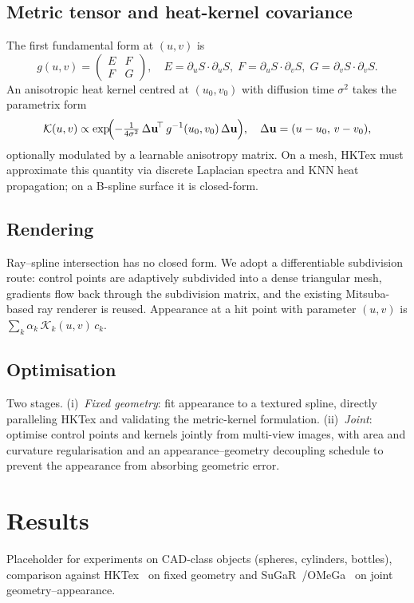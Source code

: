 \documentclass[acmtog, review=true, authorversion=false]{acmart}
\newcommand{\vect}[1]{\mathbf{#1}}
\begin{document}
\subsection{Metric tensor and heat-kernel covariance}
The first fundamental form at $(u,v)$ is
\[
  g(u,v)=\begin{pmatrix}E&F\\F&G\end{pmatrix},\quad
  E=\partial_uS\!\cdot\!\partial_uS,\;
  F=\partial_uS\!\cdot\!\partial_vS,\;
  G=\partial_vS\!\cdot\!\partial_vS.
\]
An anisotropic heat kernel centred at $(u_0,v_0)$ with diffusion time
$\sigma^2$ takes the parametrix form
\[
  \mathcal{K}(u,v)\propto
  \exp\!\Bigl(-\tfrac{1}{4\sigma^2}\,\Delta\vect{u}^{\!\top}\,
    g^{-1}(u_0,v_0)\,\Delta\vect{u}\Bigr),
  \quad \Delta\vect{u}=(u-u_0,\,v-v_0),
\]
optionally modulated by a learnable anisotropy matrix. On a mesh, HKTex must
approximate this quantity via discrete Laplacian spectra and KNN heat
propagation; on a B-spline surface it is closed-form.

\subsection{Rendering}
Ray--spline intersection has no closed form. We adopt a differentiable
subdivision route: control points are adaptively subdivided into a dense
triangular mesh, gradients flow back through the subdivision matrix, and the
existing Mitsuba-based ray renderer is reused. Appearance at a hit point with
parameter $(u,v)$ is $\sum_k \alpha_k\,\mathcal{K}_k(u,v)\,c_k$.

\subsection{Optimisation}
Two stages. (i)~\emph{Fixed geometry}: fit appearance to a textured spline,
directly paralleling HKTex and validating the metric-kernel formulation.
(ii)~\emph{Joint}: optimise control points and kernels jointly from
multi-view images, with area and curvature regularisation and an
appearance--geometry decoupling schedule to prevent the appearance from
absorbing geometric error.

\section{Results}\label{sec:results}
Placeholder for experiments on CAD-class objects (spheres, cylinders,
bottles), comparison against HKTex~\cite{hktex} on fixed geometry and
SuGaR~\cite{sugar}/OMeGa~\cite{omega} on joint geometry--appearance.
\end{document}
